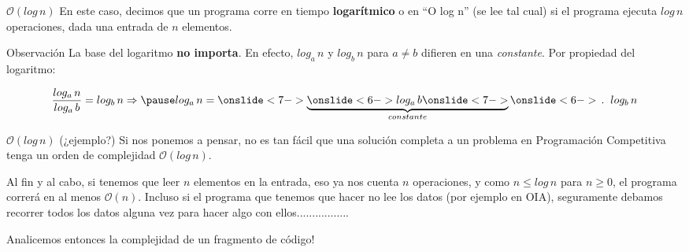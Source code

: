 \documentclass{beamer}
\begin{document}
    \begin{frame}{$\mathcal{O}(log \, n)$}
        En este caso, decimos que un programa corre en tiempo \textbf{logarítmico} o en ``O log n'' (se lee tal cual) si el programa ejecuta $log \, n$ operaciones, dada una entrada de $n$ elementos. \pause 
        \begin{block}{Observación}
            La base del logaritmo \textbf{no importa}. \pause En efecto, $log_a \, n$ y $log_b \, n$ para $a \neq b$ difieren en una \textit{constante}. \pause Por propiedad del logaritmo: \pause

            $$ \frac{log_a \, n}{log_a \, b} = log_b \, n \Rightarrow \pause log_a \, n = \onslide<7-> \underbrace{ \onslide<6-> log_a \, b \onslide<7-> }_{constante} \onslide<6-> \, . \;\; log_b \, n$$
        \end{block}
    \end{frame}

    \begin{frame}{$\mathcal{O}(log \, n)$ (¿ejemplo?)}
        Si nos ponemos a pensar, no es tan fácil que una solución completa a un problema en Programación Competitiva tenga un orden de complejidad $\mathcal{O}(log \, n)$. \pause

        Al fin y al cabo, si tenemos que leer $n$ elementos en la entrada, eso ya nos cuenta $n$ operaciones, y como $n \leq log \, n$ para $n \geq 0$, el programa correrá en al menos $\mathcal{O}(n)$. \pause Incluso si el programa que tenemos que hacer no lee los datos (por ejemplo en OIA), seguramente debamos recorrer todos los datos alguna vez para hacer algo con ellos...\pause.............. \pause \vspace{8pt}

        Analicemos entonces la complejidad de un fragmento de código!
    \end{frame}
\end{document}
